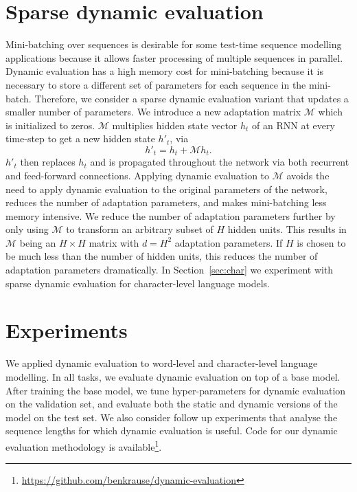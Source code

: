 \documentclass{article}
\begin{document}
\section{Sparse dynamic evaluation}
\label{sec:mem}

Mini-batching over sequences is desirable for some test-time sequence modelling applications because it allows faster processing of multiple sequences in parallel. Dynamic evaluation has a high memory cost for mini-batching because it is necessary to store a different set of parameters for each sequence in the mini-batch. Therefore, we consider a sparse dynamic evaluation variant that updates a smaller number of parameters. We introduce a new adaptation matrix $\mathcal{M}$ which is initialized to zeros. $\mathcal{M}$ multiplies hidden state vector $h_t$ of an RNN at every time-step to get a new hidden state $h'_t$, via
\begin{equation}
h'_t = h_t + \mathcal{M} h_t .
\end{equation}
$h'_t$ then replaces $h_t$ and is propagated throughout the network via both recurrent and feed-forward connections. Applying dynamic evaluation to $\mathcal{M}$ avoids the need to apply dynamic evaluation to the original parameters of the network, reduces the number of adaptation parameters, and makes mini-batching less memory intensive. We reduce the number of adaptation parameters further by only using $\mathcal{M}$ to transform an arbitrary subset of $H$ hidden units. This results in $\mathcal{M}$ being an $H\!\times\!H$ matrix with $d=H^2$ adaptation parameters. If $H$ is chosen to be much less than the number of hidden units, this reduces the number of adaptation parameters dramatically. In Section~\ref{sec:char} we experiment with sparse dynamic evaluation for character-level language models.

\section{Experiments}

We applied dynamic evaluation to word-level and character-level language modelling.  In all tasks, we evaluate dynamic evaluation on top of a base model. After training the base model, we tune hyper-parameters for dynamic evaluation on the validation set, and evaluate both the static and dynamic versions of the model on the test set. We also consider follow up experiments that analyse the sequence lengths for which dynamic evaluation is useful. Code for our dynamic evaluation methodology is available\footnote{\url{https://github.com/benkrause/dynamic-evaluation}}.
\end{document}
